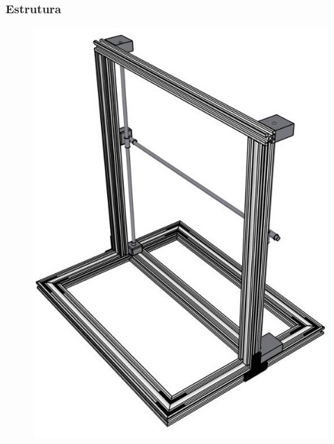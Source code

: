 \begin{frame}
\frametitle{Estrutura}

\begin{figure}
\centering
\includegraphics[scale = 0.30]{figuras/estruturamesa}
\end{figure}  

\end{frame}
    
